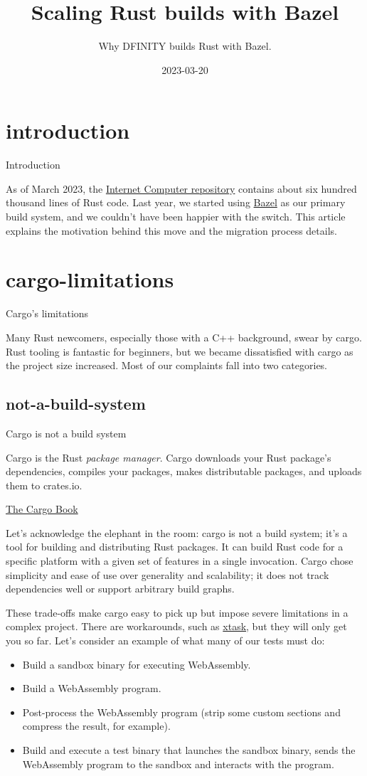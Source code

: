 \documentclass{article}
\title{Scaling Rust builds with Bazel}
\subtitle{Why DFINITY builds Rust with Bazel.}
\date{2023-03-20}
\begin{document}
\section{introduction}{Introduction}

As of March 2023, the \href{https://github.com/dfinity/ic}{Internet Computer repository} contains about six hundred thousand lines of Rust code.
Last year, we started using \href{https://bazel.build/}{Bazel} as our primary build system, and we couldn't have been happier with the switch.
This article explains the motivation behind this move and the migration process details.

\section{cargo-limitations}{Cargo's limitations}

Many Rust newcomers, especially those with a C++ background, swear by cargo.
Rust tooling is fantastic for beginners, but we became dissatisfied with cargo as the project size increased.
Most of our complaints fall into two categories.

\subsection{not-a-build-system}{Cargo is not a build system}
\epigraph{
    Cargo is the Rust \emph{package manager}.
    Cargo downloads your Rust package's dependencies, compiles your packages, makes distributable packages, and uploads them to crates.io.
}{\href{https://doc.rust-lang.org/cargo/}{The Cargo Book}}

Let's acknowledge the elephant in the room: cargo is not a build system; it's a tool for building and distributing Rust packages.
It can build Rust code for a specific platform with a given set of features in a single invocation.
Cargo chose simplicity and ease of use over generality and scalability; it does not track dependencies well or support arbitrary build graphs.

These trade-offs make cargo easy to pick up but impose severe limitations in a complex project.
There are workarounds, such as \href{https://github.com/matklad/cargo-xtask}{xtask}, but they will only get you so far.
Let's consider an example of what many of our tests must do:

\begin{itemize}
  \item Build a sandbox binary for executing WebAssembly.
  \item Build a WebAssembly program.
  \item Post-process the WebAssembly program (strip some custom sections and compress the result, for example).
  \item Build and execute a test binary that launches the sandbox binary, sends the WebAssembly program to the sandbox and interacts with the program.
\end{itemize}
\end{document}

